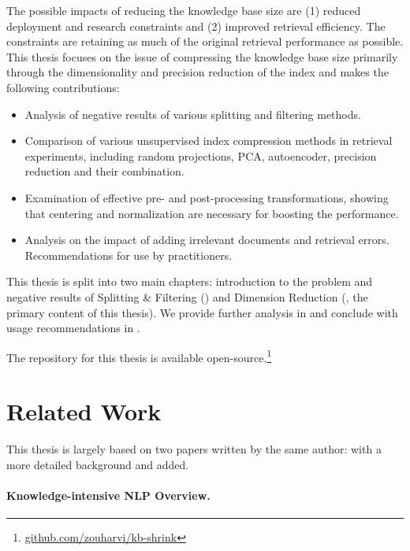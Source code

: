 The possible impacts of reducing the knowledge base size are (1) reduced deployment and research constraints and (2) improved retrieval efficiency.
The constraints are retaining as much of the original retrieval performance as possible.
This thesis focuses on the issue of compressing the knowledge base size primarily through the dimensionality and precision reduction of the index and makes the following contributions:

\begin{itemize}
    \item Analysis of negative results of various splitting and filtering methods.
    \item Comparison of various unsupervised index compression methods in retrieval experiments, including random projections, PCA, autoencoder, precision reduction and their combination. %
    \item Examination of effective pre- and post-processing transformations, showing that centering and normalization are necessary for boosting the performance.
    \item Analysis on the impact of adding irrelevant documents and retrieval errors. Recommendations for use by practitioners.
\end{itemize}

This thesis is split into two main chapters: introduction to the problem and negative results of Splitting \& Filtering () and Dimension Reduction (, the primary content of this thesis).
We provide further analysis in  and conclude with usage recommendations in .

The repository for this thesis is available open-source.\footnote{
    \href{https://github.com/zouharvi/kb-shrink}{github.com/zouharvi/kb-shrink}
}

\section{Related Work}

This thesis is largely based on two papers written by the same author: \citet{zouhar2021artefact,zouhar2022knowledge} with a more detailed background and  added.

\paragraph{Knowledge-intensive NLP Overview.}

